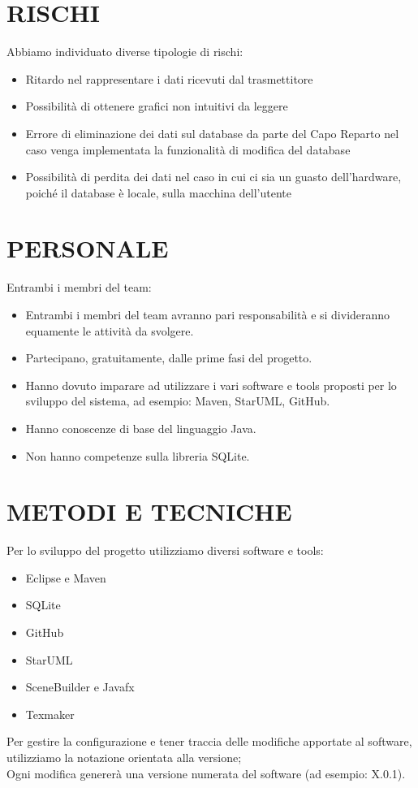 \documentclass{report}
\begin{document}
\chapter{RISCHI}
Abbiamo individuato diverse tipologie di rischi:
\begin{itemize}
\item Ritardo nel rappresentare i dati ricevuti dal trasmettitore
\item Possibilità di ottenere grafici non intuitivi da leggere
\item Errore di eliminazione dei dati sul database da parte del Capo Reparto nel caso venga implementata la funzionalità di modifica del database
\item Possibilità di perdita dei dati nel caso in cui ci sia un guasto dell'hardware, poiché il database è locale, sulla macchina dell'utente
\end{itemize}

\begingroup
\let\clearpage\relax
\chapter{PERSONALE}
\endgroup
Entrambi i membri del team:
\begin{itemize}
\item Entrambi i membri del team avranno pari responsabilità e si divideranno equamente le attività da svolgere.
\item Partecipano, gratuitamente, dalle prime fasi del progetto.
\item Hanno dovuto imparare ad utilizzare i vari software e tools proposti per lo sviluppo del sistema, ad esempio:
 Maven, StarUML, GitHub.
\item Hanno conoscenze di base del linguaggio Java.
\item Non hanno competenze sulla libreria SQLite.
\end{itemize}

\chapter{METODI E TECNICHE}
Per lo sviluppo del progetto utilizziamo diversi software e tools:
\begin{itemize}
\item Eclipse e Maven
\item SQLite
\item GitHub
\item StarUML
\item SceneBuilder e Javafx
\item Texmaker
\end{itemize}
Per gestire la configurazione e tener traccia delle modifiche apportate al software, utilizziamo la notazione orientata alla versione;\\
Ogni modifica genererà una versione numerata del software (ad esempio: X.0.1).
\end{document}

